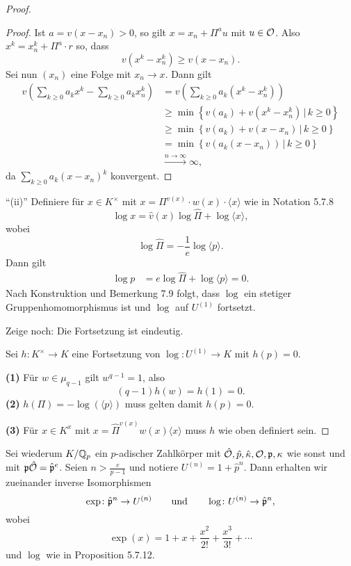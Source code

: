 \begin{proof}
\begin{proof}
Ist $a = v(x-x_n)>0$, so gilt $x = x_n + \Pi^a u$ mit $u \in \mathcal{O}$. Also
$x^k = x_n^k + \Pi^a \cdot r$ so, dass 
\[ v\left( x^k - x_n^k \right) \geq v\left( x - x_n \right).
\]
Sei nun $(x_n)$ eine Folge mit $x_n \to x$. Dann gilt
\begin{align*}
v \left( \sum_{k \geq 0} a_k x^k - \sum_{k \geq 0} a_k x_n^k  \right)
&= v \left( \sum_{k \geq 0} a_k \left(x^k - x_n^k\right)  \right) \\
&\geq \min \left\{ v(a_k) + v\left( x^k - x_n^k \right) \, | \, k \geq 0 \right\} \\
&\geq \min \left\{ v(a_k) + v\left( x - x_n \right) \, | \, k \geq 0 \right\} \\
&=\min \left\{ v\left( a_k \left(x - x_n \right)\right) \, | \, k \geq 0 \right\} \\
&\xrightarrow{n \to \infty} \infty,
\end{align*}
da $\sum_{k \geq 0} a_k (x-x_n)^k$ konvergent.
\end{proof}

\enquote{(ii)} Definiere für $x \in K^\times$ mit $ x = \Pi^{v(x)} \cdot w(x) \cdot \langle x \rangle$ wie in Notation 5.7.8
\[ \log x = \hat{v}(x) \log \hat{\Pi} + \log \langle x \rangle,
\]
wobei
\[ \log \hat{\Pi} = - \frac{1}{e} \log \langle p \rangle.
\]
Dann gilt
\begin{align*}
\log p
&= e \log \hat{\Pi} + \log \langle p \rangle 
= 0.
\end{align*}
Nach Konstruktion und Bemerkung 7.9 folgt, dass $\log$ ein stetiger Gruppenhomomorphismus ist und $\log$ auf $U^{(1)}$ fortsetzt.

\bigskip Zeige noch: Die Fortsetzung ist eindeutig.

Sei $h\colon K^\times \to K$ eine Fortsetzung von $\log \colon U^{(1)} \to K$ mit $h(p)=0$.

\textbf{(1)} Für $w \in \mu_{q-1}$ gilt $w^{q-1} = 1$, also
\[ (q-1)h(w) = h(1) = 0.
\]
\textbf{(2)} $h(\Pi) = - \log (\langle p \rangle)$ muss gelten damit $h(p) = 0$.

\textbf{(3)} Für $x\in K^x$ mit $x=\hat{\Pi}^{v(x)}w(x) \langle x \rangle$ muss $h$ wie oben definiert sein.
\end{proof}


\begin{Prop}
Sei wiederum $K/\mathbb{Q}_p$ ein $p$-adischer Zahlkörper mit $\hat{\mathcal{O}}, \hat{p}, \hat{\kappa}, \mathcal{O}, \mathfrak{p}, \kappa$ wie sonst und mit $\mathfrak{p}\hat{\mathcal{O}} = \hat{\mathfrak{p}}^e$. Seien $n > \frac{e}{p-1}$ und notiere $U^{(n)} = 1 + \hat{p}^n $. Dann erhalten wir zueinander inverse Isomorphismen
\[ \exp \colon \hat{\mathfrak{p}}^n  \to U^{(n)} \qquad \text{und} \qquad 
\log \colon   U^{(n)} \to \hat{\mathfrak{p}}^n,
\]
wobei 
\[ \exp(x) = 1+ x + \frac{x^2}{2!} + \frac{x^3}{3!} + \cdots
\]
und $\log$ wie in Proposition 5.7.12.
\end{Prop}

